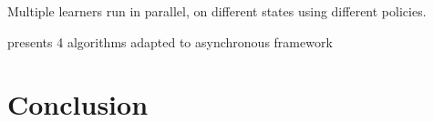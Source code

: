 \documentclass[runningheads]{llncs}
\begin{document}
Multiple learners run in parallel, on different states using different policies.

\cite{mnih2016asynchronous} presents 4 algorithms adapted to asynchronous framework

\section{}

\section{Conclusion}

%
%
%
% 
% 
%



\end{document}
